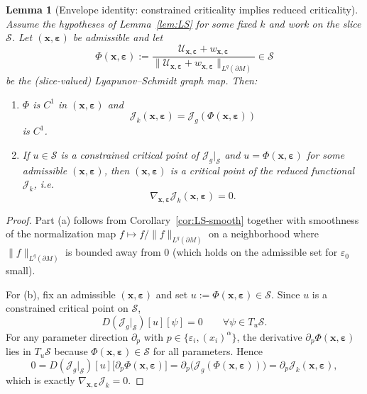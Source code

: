 \documentclass[11pt,reqno,a4paper]{amsart}
\numberwithin{equation}{section}
\theoremstyle{plain}
\newtheorem{lemma}[theorem]{Lemma}
\theoremstyle{remark}
\theoremstyle{plain}
\begin{document}
\begin{lemma}[Envelope identity: constrained criticality implies reduced criticality]\label{lem:critical-to-reduced-k}
Assume the hypotheses of Lemma~\ref{lem:LS} for some fixed $k$ and work on the slice $\mathcal S$.
Let $(\mathbf x,\boldsymbol\varepsilon)$ be admissible and let
\[
\Phi(\mathbf x,\boldsymbol\varepsilon)
:=\frac{\mathcal U_{\mathbf x,\boldsymbol\varepsilon}+w_{\mathbf x,\boldsymbol\varepsilon}}
{\big\|\mathcal U_{\mathbf x,\boldsymbol\varepsilon}+w_{\mathbf x,\boldsymbol\varepsilon}\big\|_{L^q(\partial M)}}
\in\mathcal S
\]
be the (slice-valued) Lyapunov--Schmidt graph map. Then:
\begin{enumerate}[label=(\alph*),leftmargin=1.25em]
\item $\Phi$ is $C^1$ in $(\mathbf x,\boldsymbol\varepsilon)$ and
\[
\mathcal J_k(\mathbf x,\boldsymbol\varepsilon)=\mathcal J_g(\Phi(\mathbf x,\boldsymbol\varepsilon))
\]
is $C^1$.
\item If $u\in\mathcal S$ is a constrained critical point of $\mathcal J_g|_{\mathcal S}$ and
$u=\Phi(\mathbf x,\boldsymbol\varepsilon)$ for some admissible $(\mathbf x,\boldsymbol\varepsilon)$, then
$(\mathbf x,\boldsymbol\varepsilon)$ is a critical point of the reduced functional $\mathcal J_k$, i.e.
\[
\nabla_{\mathbf x,\boldsymbol\varepsilon}\mathcal J_k(\mathbf x,\boldsymbol\varepsilon)=0.
\]
\end{enumerate}
\end{lemma}

\begin{proof}
Part (a) follows from Corollary~\ref{cor:LS-smooth} together with smoothness of the normalization map
$f\mapsto f/\|f\|_{L^q(\partial M)}$ on a neighborhood where $\|f\|_{L^q(\partial M)}$ is bounded away from $0$
(which holds on the admissible set for $\varepsilon_0$ small).

For (b), fix an admissible $(\mathbf x,\boldsymbol\varepsilon)$ and set $u:=\Phi(\mathbf x,\boldsymbol\varepsilon)\in\mathcal S$.
Since $u$ is a constrained critical point on $\mathcal S$,
\[
D(\mathcal J_g|_{\mathcal S})[u][\psi]=0\qquad\forall\psi\in T_u\mathcal S.
\]
For any parameter direction $\partial_{p}$ with $p\in\{\varepsilon_i,(x_i)^\alpha\}$, the derivative
$\partial_p\Phi(\mathbf x,\boldsymbol\varepsilon)$ lies in $T_u\mathcal S$ because
$\Phi(\mathbf x,\boldsymbol\varepsilon)\in\mathcal S$ for all parameters. Hence
\[
0
= D(\mathcal J_g|_{\mathcal S})[u]\big[\partial_p\Phi(\mathbf x,\boldsymbol\varepsilon)\big]
=\partial_p\big(\mathcal J_g(\Phi(\mathbf x,\boldsymbol\varepsilon))\big)
=\partial_p\mathcal J_k(\mathbf x,\boldsymbol\varepsilon),
\]
which is exactly $\nabla_{\mathbf x,\boldsymbol\varepsilon}\mathcal J_k=0$.
\end{proof}
\end{document}
